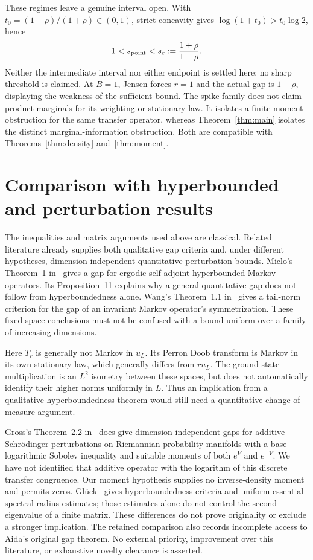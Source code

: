 \documentclass[11pt]{article}
\begin{document}
These regimes leave a genuine interval open. With
$t_0=(1-\rho)/(1+\rho)\in(0,1)$, strict concavity gives
$\log(1+t_0)>t_0\log2$, hence
\[
 1<s_{\rm point}<s_c:=\frac{1+\rho}{1-\rho}.
\]
Neither the intermediate interval nor either endpoint is settled here;
no sharp threshold is claimed. At $B=1$, Jensen forces $r=1$ and the
actual gap is $1-\rho$, displaying the weakness of the sufficient bound.
The spike family does not claim product marginals for its weighting or
stationary law. It isolates a finite-moment obstruction for the same
transfer operator, whereas Theorem~\ref{thm:main} isolates the distinct
marginal-information obstruction. Both are compatible with
Theorems~\ref{thm:density} and~\ref{thm:moment}.

\section{Comparison with hyperbounded and perturbation results}
The inequalities and matrix arguments used above are classical. Related
literature already supplies both qualitative gap criteria and, under
different hypotheses, dimension-independent quantitative perturbation
bounds. Miclo's Theorem~1 in~\cite{Miclo} gives a gap for ergodic
self-adjoint hyperbounded Markov operators. Its Proposition~11 explains
why a general quantitative gap does not follow from hyperboundedness
alone. Wang's Theorem~1.1 in~\cite{Wang} gives a tail-norm criterion
for the gap of an invariant Markov operator's symmetrization.
These fixed-space conclusions must not be confused with a bound uniform
over a family of increasing dimensions.

Here $T_r$ is generally not Markov in $u_L$. Its Perron Doob transform
is Markov in its own stationary law, which generally differs from $r u_L$.
The ground-state multiplication is an $L^2$ isometry between these spaces,
but does not automatically identify their higher norms uniformly in $L$.
Thus an implication from a qualitative hyperboundedness theorem would
still need a quantitative change-of-measure argument.

Gross's Theorem~2.2 in~\cite{Gross} does give dimension-independent gaps
for additive Schr\"odinger perturbations on Riemannian probability
manifolds with a base logarithmic Sobolev inequality and suitable moments
of both $e^V$ and $e^{-V}$. We have not identified that additive operator
with the logarithm of this discrete transfer congruence. Our moment
hypothesis supplies no inverse-density moment and permits zeros.
Gl\"uck~\cite{Gluck} gives hyperboundedness criteria and uniform essential
spectral-radius estimates; those estimates alone do not control the
second eigenvalue of a finite matrix. These differences do not prove
originality or exclude a stronger implication. The retained comparison
also records incomplete access to Aida's original gap theorem.
No external priority, improvement over this literature, or exhaustive
novelty clearance is asserted.
\end{document}
